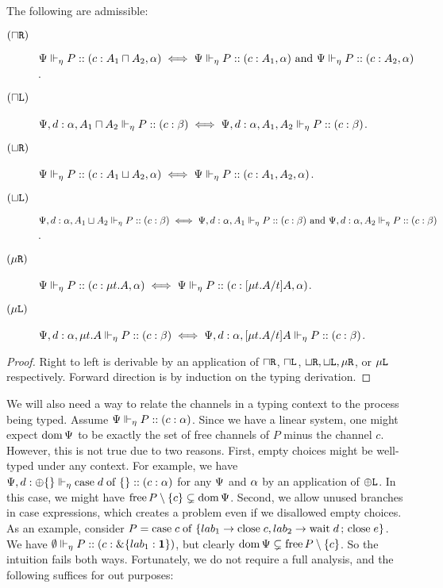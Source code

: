 \begin{lemma}[Invertibility]
  \label{algorithmic:property-invertible}
  The following are admissible:
  \begin{description}
    \item[$(\mathbin{\sqcap}\texttt{R})$] ${\Psi} \Vdash_{\eta} P :: (c : A_1 \mathbin{\sqcap} A_2, \alpha) \iff {\Psi} \Vdash_{\eta} P :: (c : A_1, \alpha) \text{ and } {\Psi} \Vdash_{\eta} P :: (c : A_2, \alpha)$.
    \item[$(\mathbin{\sqcap}\texttt{L})$] ${\Psi, d : \alpha, A_1 \mathbin{\sqcap} A_2} \Vdash_{\eta} P :: (c : \beta) \iff {\Psi, d : \alpha, A_1, A_2} \Vdash_{\eta} P :: (c : \beta)$.

    \item[$(\mathbin{\sqcup}\texttt{R})$] ${\Psi} \Vdash_{\eta} P :: (c : A_1 \mathbin{\sqcup} A_2, \alpha) \iff {\Psi} \Vdash_{\eta} P :: (c : A_1, A_2, \alpha)$.
    \item[$(\mathbin{\sqcup}\texttt{L})$] ${\Psi, d : \alpha, A_1 \mathbin{\sqcup} A_2} \Vdash_{\eta} P :: (c : \beta) \iff
    {\Psi, d : \alpha, A_1} \Vdash_{\eta} P :: (c : \beta)
    \text{ and } {\Psi, d : \alpha, A_2} \Vdash_{\eta} P :: (c : \beta)$.

    \item[$(\mu\texttt{R})$] ${\Psi} \Vdash_{\eta} P :: (c : \mu{t} . {A}, \alpha) \iff {\Psi} \Vdash_{\eta} P :: (c : \lbrack{\mu{t} . {A}}/{t}\rbrack{A}, \alpha)$.
    \item[$(\mu\texttt{L})$] ${\Psi, d : \alpha, \mu{t} . {A}} \Vdash_{\eta} P :: (c : \beta) \iff
    {\Psi, d : \alpha, \lbrack{\mu{t} . {A}}/{t}\rbrack{A}} \Vdash_{\eta} P :: (c : \beta)$.
  \end{description}
\end{lemma}
\begin{proof}
  Right to left is derivable by an application of $\mathbin{\sqcap}\texttt{R}$, $\mathbin{\sqcap}\texttt{L}$, $\mathbin{\sqcup}\texttt{R}, \mathbin{\sqcup}\texttt{L}, \mu\texttt{R}$, or $\mu\texttt{L}$ respectively. Forward direction is by induction on the typing derivation.
\end{proof}


We will also need a way to relate the channels in a typing context to the process being typed. Assume ${\Psi} \Vdash_{\eta} P :: (c : \alpha)$. Since we have a linear system, one might expect $\operatorname{dom} \Psi$ to be exactly the set of free channels of $P$ minus the channel $c$. However, this is not true due to two reasons. First, empty choices might be well-typed under any context. For example, we have ${\Psi, d : \oplus \lbrace\rbrace} \Vdash_{\eta} \mathrm{case}\;d\;\mathrm{of}\;\lbrace\rbrace :: (c : \alpha)$ for any $\Psi$ and $\alpha$ by an application of $\oplus\texttt{L}$. In this case, we might have $\operatorname{free} P \setminus \lbrace c\rbrace \subsetneq \operatorname{dom} \Psi$. Second, we allow unused branches in case expressions, which creates a problem even if we disallowed empty choices. As an example, consider
$P = \mathrm{case}\;c\;\mathrm{of}\;\lbrace lab_1 \rightarrow \mathrm{close}\;c, lab_2 \rightarrow \mathrm{wait}\;d \,;\, \mathrm{close}\;e \rbrace$.
We have ${\emptyset} \Vdash_{\eta} P :: (c : \&\lbrace{lab_1} : {\mathbf{1}}\rbrace)$, but clearly $\operatorname{dom} \Psi \subsetneq \operatorname{free} P \setminus \lbrace c\rbrace$. So the intuition fails both ways. Fortunately, we do not require a full analysis, and the following suffices for out purposes:

